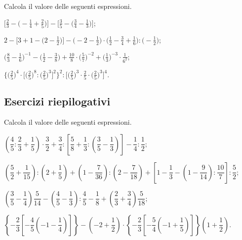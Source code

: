 \begin{esercizio}[\Ast]
 \label{ese:3.140}
 Calcola il valore delle seguenti espressioni.
\begin{enumeratea}
\spazielenx
\item $\displaystyle{\bigg[\frac{2}{3}-\bigg(-\frac{1}{4}+\frac{2}{5}\bigg)\bigg]-\bigg[\frac{3}{5}-%
\bigg(\frac{3}{4}-\frac{1}{3}\bigg)\bigg]}$;
\item $\displaystyle{2-\bigg[3+1-\bigg(2-\frac{1}{2}\bigg)\bigg]-\bigg(-2-\frac{1}{2}\bigg)\cdot%
\bigg(\frac{1}{2}-\frac{3}{4}+\frac{1}{6}\bigg):\bigg(-{\frac{1}{2}}\bigg)}$;
\item $\displaystyle{\bigg(\frac{8}{3}-\frac{1}{6}\bigg)^{-1}-\bigg(\frac{1}{2}-\frac{3}{8}\bigg)+\frac{10}{8}\cdot%
\bigg(\frac{5}{7}\bigg)^{-2}+\bigg(\frac{1}{3}\bigg)^{-3}\cdot\frac{1}{6^{2}}}$;
\item $\displaystyle{\bigg\{\bigg(\frac{2}{5}\bigg)^{4}\cdot\bigg[\bigg(\frac{2}{5}\bigg)^{8}:%
\bigg(\frac{2}{5}\bigg)^{3}\bigg]^{2}\bigg\}^{2}:\bigg[\bigg(\frac{2}{5}\bigg)^{3}\cdot{\frac{2}{5}}\cdot%
\bigg(\frac{2}{5}\bigg)^{3}\bigg]^{4}}$.
\end{enumeratea}
\end{esercizio}

\subsection{Esercizi riepilogativi}

\begin{esercizio}[\Ast]%
 Calcola il valore delle seguenti espressioni.
\begin{enumeratea}
\spazielenx
\item $\left(\dfrac{4}{5}:\dfrac{2}{3}+\dfrac{1}{5}\right)\cdot \dfrac{3}{2}+\dfrac{3}{4}:\left[\dfrac{5}{8}+\dfrac{1}{3}:\left(\dfrac{3}{5}-\dfrac{1}{3}\right)\right]-\dfrac{1}{4}:\dfrac{1}{2}$;
\item $\left(\dfrac{5}{2}+\dfrac{1}{15}\right):\left(2+\dfrac{1}{5}\right)+\left(1-\dfrac{7}{36}\right):\left(2-\dfrac{7}{18}\right)+\left[1-\dfrac{1}{3}-\left(1-\dfrac{9}{14}\right):\dfrac{10}{7}\right]:\dfrac{5}{2}$;
\item $\left(\dfrac{3}{5}-\dfrac{1}{4}\right)\dfrac{5}{14}-\left(\dfrac{4}{5}-\dfrac{1}{3}\right):\dfrac{4}{5}-\dfrac{1}{8}+\left(\dfrac{2}{3}+\dfrac{3}{4}\right)\dfrac{5}{18}$;
\item $\left\lbrace-\dfrac{2}{3}\left[-\dfrac{4}{5}\left(-1-\dfrac{1}{4}\right)\right]\right\rbrace-\left(-2+\dfrac{1}{2}\right)\cdot\left\lbrace-\dfrac{2}{3}\left[-\dfrac{5}{4}\left(-1+\dfrac{1}{5}\right)\right]\right\rbrace\left(1+\dfrac{1}{2}\right)$.
\end{enumeratea}
\end{esercizio}

